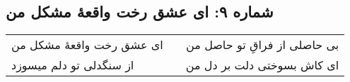 \begin{center}
\section*{شماره ۹: ای عشق رخت واقعۀ مشکل من}
\label{sec:009}
\begin{longtable}{l p{0.5cm} r}
ای عشق رخت واقعهٔ مشکل من
&&
بی حاصلی از فراقِ تو حاصل من
\\
از سنگدلی تو دلم میسوزد
&&
ای کاش بسوختی دلت بر دل من
\\
\end{longtable}
\end{center}
